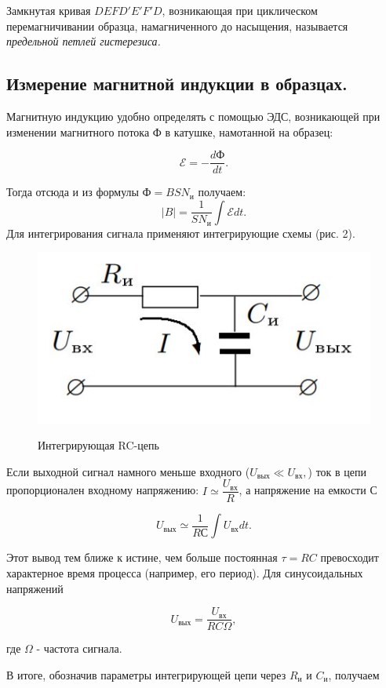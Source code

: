 \documentclass[12pt]{kiarticle}
\begin{document}
	Замкнутая кривая $DEFD'E'F'D$, возникающая при циклическом
	перемагничивании образца, намагниченного до насыщения, называется \textit{предельной петлей гистерезиса.}
	
	
	\subsection{Измерение магнитной индукции в образцах.}
	Магнитную индукцию удобно определять с помощью ЭДС, возникающей при изменении магнитного потока Ф в катушке, намотанной на образец:
	
	$$\mathscr{E} = -\dfrac{dФ}{dt}.$$
	
	Тогда отсюда и из формулы $Ф=BSN_{и}$ получаем:
		$$|B|=\dfrac{1}{SN_{и}}\int \mathscr{E}dt.$$
	Для интегрирования сигнала применяют интегрирующие схемы (рис. 2).
	
		\begin{figure}
		\vspace{-20pt}
		\begin{center}
			\includegraphics[width=0.7\linewidth]{gist2.jpg}
			\label{fig:sdfsafd}
		\end{center}
		\vspace{-10pt}
		\caption{Интегрирующая RC-цепь}
	\end{figure}
	
	Если выходной сигнал намного меньше входного ($U_{вых}\ll U_{вх},$) ток в цепи пропорционален входному напряжению: $I\simeq\dfrac{U_{вх}}{R}$, а напряжение на емкости С
	
	$$U_{вых}\simeq\dfrac{1}{RС}\int U_{вх}dt.$$
	
	Этот вывод тем ближе к истине, чем больше постоянная $\tau=RC$ превосходит характерное время процесса (например, его период). Для синусоидальных напряжений
	
	$$U_{вых}=\dfrac{U_{вх}}{RC\Omega},$$
	
	где $\Omega$ - частота сигнала.
	
	В итоге, обозначив параметры интегрирующей цепи через $R_{и}$ и $C_{и}$, получаем
	
\end{document}
